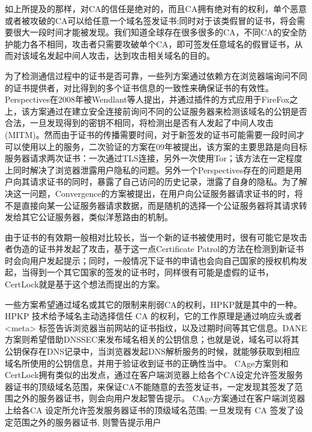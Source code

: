 如上所提及的那样，对CA的信任是绝对的，而且CA拥有绝对有的权利，单个恶意或者被攻破的CA可以给任意一个域名签发证书\supercite{ducklin2013turktrust};同时对于该类假冒的证书，将会需要很大一段时间才能被发现。我们知道全球存在很多很多的CA，不同CA的安全防护能力各不相同，攻击者只需要攻破单个CA，即可签发任意域名的假冒证书，从而对该域名发起中间人攻击，达到攻击相关域名的目的。


为了检测通信过程中的证书是否可靠，一些列方案通过依赖方在浏览器端询问不同的证书提供者，对比得到的多个证书信息的一致性来确保证书的有效性。Perspectives\supercite{wendlandt2008perspectives}在2008年被Wendlant等人提出，并通过插件的方式应用于FireFox之上，该方案通过在建立安全连接前询问不同的公证服务器来检测该域名的公钥是否合法，一旦发现得到的密钥不相同，将检测出是否有人发起了中间人攻击(MITM)。然而由于证书的传播需要时间，对于新签发的证书可能需要一段时间才可以使用以上的服务，二次验证\supercite{alicherry2009doublecheck}的方案在09年被提出，该方案的主要思路是向目标服务器请求两次证书：一次通过TLS连接，另外一次使用Tor\supercite{alicherry2009doublecheck}；该方法在一定程度上同时解决了浏览器泄露用户隐私的问题。另外一个Perspectives存在的问题是用户向其请求证书的同时，暴露了自己访问的历史记录，泄露了自身的隐私。为了解决这一问题，Convergence\supercite{convergence}的方案被提出，在用户向公证服务器请求证书的时，将不是直接向某一公证服务器请求数据，而是随机的选择一个公证服务器将其请求转发给其它公证服务器，类似洋葱路由的机制。

由于证书的有效期一般相对比较长，当一个新的证书被使用时，很有可能它是攻击者伪造的证书并发起了攻击，基于这一点Certificate Patrol\supercite{modell2014certificate}的方法在检测到新证书时会向用户发起提示；同时，一般情况下证书的申请也会向自己国家的授权机构发起，当得到一个其它国家的签发的证书时，同样很有可能是虚假的证书，CertLock\supercite{soghoian2011certified}就是基于这个想法而提出的方案。%

一些方案希望通过域名或其它的限制来削弱CA的权利，HPKP\supercite{evans2015public}就是其中的一种。HPKP 技术给予域名主动选择信任 CA 的权利，它的工作原理是通过响应头或者 <meta> 标签告诉浏览器当前网站的证书指纹，以及过期时间等其它信息。DANE\supercite{barnes2011dane}方案则希望借助DNSSEC来发布域名相关的公钥信息；也就是说，域名可以将其公钥保存在DNS记录中，当浏览器发起DNS解析服务的时候，就能够获取到相应域名所使用的公钥信息，并用于验证收到证书的正确性当中。
CAge方案则和CertLock拥有类似的出发点，通过在客户端浏览器上给各个CA设定允许签发服务器证书的顶级域名范围，来保证CA不能随意的去签发证书，一定发现其签发了范围之外的服务器证书，则会向用户发起警告提示。
CAge方案通过在客户端浏览器上给各CA 设定所允许签发服务器证书的顶级域名范围; 一旦发现有 CA 签发了设定范围之外的服务器证书, 则警告提示用户

